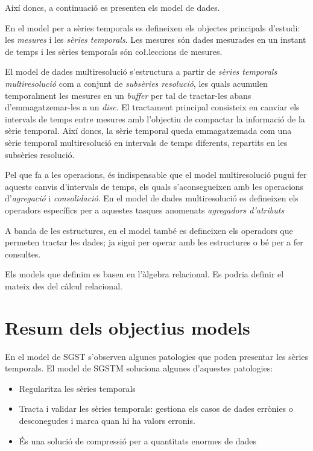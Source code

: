 Així doncs, a continuació es presenten els model de dades.

En el model per a sèries temporals es defineixen els objectes principals d'estudi: les \emph{mesures} i les \emph{sèries temporals}. Les mesures són dades mesurades en un instant de temps i les sèries temporals són co\l.leccions de mesures.

El model de dades multiresolució s'estructura a partir de \emph{sèries temporals multiresolució} com a conjunt de \emph{subsèries resolució}, les quals  acumulen temporalment les mesures en un \emph{buffer} per tal de tractar-les abans d'emmagatzemar-les  a un \emph{disc}. El tractament principal consisteix en canviar els intervals de temps entre mesures amb l'objectiu de compactar la informació de la sèrie temporal.
Així doncs, la sèrie temporal queda emmagatzemada com una sèrie temporal multiresolució en intervals de temps diferents, repartits en les subsèries resolució. 

Pel que fa a les operacions, és indispensable que el model multiresolució pugui fer aquests canvis d'intervals de temps, els quals s'aconsegueixen amb les operacions d'\emph{agregació} i \emph{consolidació}. En el model de dades multiresolució es defineixen els operadors específics per a aquestes tasques anomenats \emph{agregadors d'atributs}


A banda de les estructures, en el model també es defineixen els
operadors que permeten tractar les dades; ja sigui per operar amb les
estructures o bé per a fer consultes.



Els models que definim es basen en l'àlgebra relacional. Es podria definir el mateix des del càlcul relacional.










\section{Resum dels objectius models}


En el model de SGST s'observen algunes patologies que poden presentar les sèries temporals. El model de SGSTM soluciona algunes d'aquestes patologies:

\begin{itemize}
\item Regularitza les sèries temporals
\item Tracta i validar les sèries temporals: gestiona els casos de dades errònies o desconegudes i marca quan hi ha valors erronis.
\item És una solució de compressió per a quantitats enormes de dades
\end{itemize}



